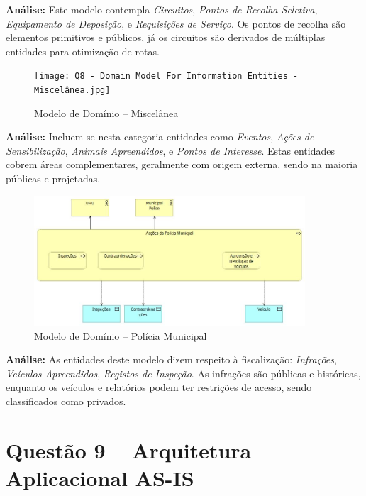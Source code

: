 \documentclass[12pt,a4paper,final]{article}
\begin{document}
    \textbf{Análise:} Este modelo contempla \textit{Circuitos}, \textit{Pontos de Recolha Seletiva}, \textit{Equipamento de Deposição}, e \textit{Requisições de Serviço}. Os pontos de recolha são elementos primitivos e públicos, já os circuitos são derivados de múltiplas entidades para otimização de rotas.

    \begin{figure}[H]
        \centering
        \texttt{[image: Q8 - Domain Model For Information Entities - Miscelânea.jpg]}
        \caption{Modelo de Domínio – Miscelânea}
        \label{fig:q8-miscelanea}
    \end{figure}

    \textbf{Análise:} Incluem-se nesta categoria entidades como \textit{Eventos}, \textit{Ações de Sensibilização}, \textit{Animais Apreendidos}, e \textit{Pontos de Interesse}. Estas entidades cobrem áreas complementares, geralmente com origem externa, sendo na maioria públicas e projetadas.

    \begin{figure}[H]
        \centering
        \includegraphics[width=0.9\textwidth]{Q8 - Domain Model For Information Entities - Municipal Police.jpg}
        \caption{Modelo de Domínio – Polícia Municipal}
        \label{fig:q8-pm}
    \end{figure}

    \textbf{Análise:} As entidades deste modelo dizem respeito à fiscalização: \textit{Infrações}, \textit{Veículos Apreendidos}, \textit{Registos de Inspeção}. As infrações são públicas e históricas, enquanto os veículos e relatórios podem ter restrições de acesso, sendo classificados como privados.

    \section*{Questão 9 – Arquitetura Aplicacional AS-IS}
\end{document}
